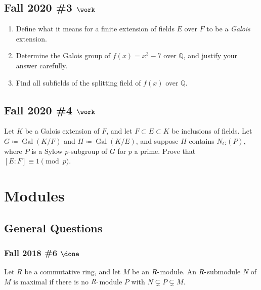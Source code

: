 \hypertarget{fall-2020-3-work}{%
\subsection{\texorpdfstring{Fall 2020 \#3
\(\work\)}{Fall 2020 \#3 \textbackslash work}}\label{fall-2020-3-work}}

\begin{enumerate}
\def\labelenumi{\alph{enumi}.}
\item
  Define what it means for a finite extension of fields \(E\) over \(F\)
  to be a \emph{Galois} extension.
\item
  Determine the Galois group of \(f(x) = x^3 - 7\) over
  \({\mathbb{Q}}\), and justify your answer carefully.
\item
  Find all subfields of the splitting field of \(f(x)\) over
  \({\mathbb{Q}}\).
\end{enumerate}

\hypertarget{fall-2020-4-work}{%
\subsection{\texorpdfstring{Fall 2020 \#4
\(\work\)}{Fall 2020 \#4 \textbackslash work}}\label{fall-2020-4-work}}

Let \(K\) be a Galois extension of \(F\), and let
\(F \subset E \subset K\) be inclusions of fields. Let
\(G \coloneqq\operatorname{Gal}(K/F)\) and
\(H \coloneqq\operatorname{Gal}(K/E)\), and suppose \(H\) contains
\(N_G(P)\), where \(P\) is a Sylow \(p\)-subgroup of \(G\) for \(p\) a
prime. Prove that \([E: F] \equiv 1 \pmod p\).

\hypertarget{modules}{%
\section{Modules}\label{modules}}

\hypertarget{general-questions}{%
\subsection{General Questions}\label{general-questions}}

\hypertarget{fall-2018-6-done}{%
\subsubsection{\texorpdfstring{Fall 2018 \#6
\(\done\)}{Fall 2018 \#6 \textbackslash done}}\label{fall-2018-6-done}}

Let \(R\) be a commutative ring, and let \(M\) be an
\(R{\hbox{-}}\)module. An \(R{\hbox{-}}\)submodule \(N\) of \(M\) is
maximal if there is no \(R{\hbox{-}}\)module \(P\) with
\(N \subsetneq P \subsetneq M\).

